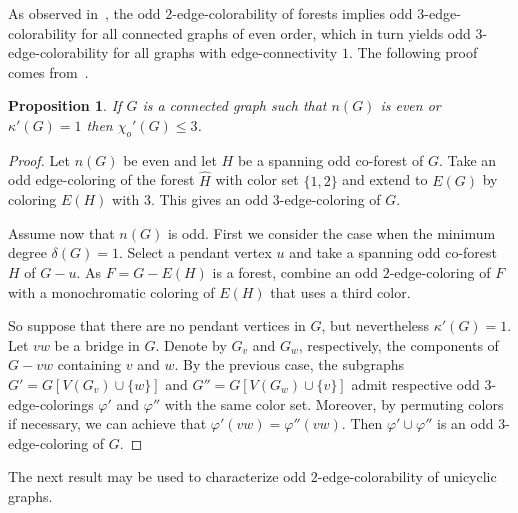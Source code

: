 \documentclass[a4paper,12pt]{article}
\newtheorem{proposition}[theorem]{Proposition}
\numberwithin{equation}{section}
\begin{document}
As observed in~\cite{Pyb91}, the odd $2$-edge-colorability of forests implies odd $3$-edge-colorability for all connected graphs of even order, which in turn yields odd $3$-edge-colorability for all graphs with edge-connectivity $1$. The following proof comes from~\cite{Pet18}.
\begin{proposition}
     \label{even order}
If $G$ is a connected graph such that $n(G)$ is even or $\kappa'(G)=1$ then $\chi_{o}'(G)\leq 3$.
\end{proposition}
\begin{proof}
 Let $n(G)$ be even and let $H$ be a spanning odd co-forest of $G$. Take an odd edge-coloring of the forest $\widehat{H}$ with color set $\{1,2\}$ and extend to $E(G)$ by coloring $E(H)$ with $3$. This gives an odd $3$-edge-coloring of $G$.

Assume now that $n(G)$ is odd.
	First we consider the case when the minimum degree $\delta(G)=1$. Select a pendant vertex $u$ and take a spanning odd co-forest $H$ of $G-u$. As $F=G-E(H)$ is a forest, combine an odd $2$-edge-coloring of $F$ with a monochromatic coloring of $E(H)$ that uses a third color.
	
	So suppose that there are no pendant vertices in $G$, but nevertheless $\kappa'(G)=1$. Let $vw$ be a bridge in $G$. Denote by $G_{v}$ and $G_{w}$, respectively,
	the components of $G-vw$ containing $v$ and $w$.
	By the previous case, the subgraphs $G'=G[V(G_{v})\cup\{w\}]$ and $G''=G[V(G_{w})\cup\{v\}]$ admit respective odd $3$-edge-colorings $\varphi'$ and $\varphi''$ with the same color set.
	Moreover, by permuting colors if necessary, we can achieve that $\varphi'(vw)=\varphi''(vw)$.
	Then $\varphi' \cup \varphi''$ is an odd $3$-edge-coloring of $G$.
\end{proof}



The next result may be used to characterize odd $2$-edge-colorability of unicyclic graphs.
\end{document}
